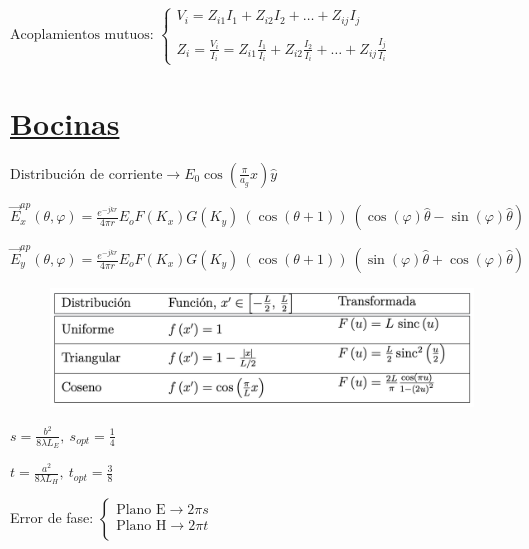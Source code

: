\documentclass[twocolumn, 8pt]{extarticle}
\begin{document}
\vspace{0.5cm}
\( \text{Acoplamientos mutuos: } \left \{
\begin{array}{l}
	V_i = Z_{i1}I_1 + Z_{i2}I_2 + \dots + Z_{ij}I_j \\ \\
	Z_i = \frac{V_i}{I_i} = Z_{i1} \frac{I_1}{I_i} + Z_{i2} \frac{I_2}{I_i} + \dots + Z_{ij} \frac{I_j}{I_i}
\end{array}
\right .
\)

\vspace{0.5cm}
\section*{\underline{Bocinas}}

\( \text{Distribución de corriente} \rightarrow E_0 \cos \left( \frac{\pi}{a_g}x \right) \hat{y} \)

\vspace{0.5cm}
\( \vec{E}_x^{ap}(\theta, \varphi) = \frac{e^{-jkr}}{4\pi r} E_o F(K_x) G(K_y)\ (\cos(\theta + 1))\ (\cos(\varphi) \hat{\theta} -  \sin(\varphi)\hat{\theta}) \)

\vspace{0.5cm}
\( \vec{E}_y^{ap}(\theta, \varphi) = \frac{e^{-jkr}}{4\pi r} E_o F(K_x) G(K_y)\ (\cos(\theta + 1))\ (\sin(\varphi) \hat{\theta} +  \cos(\varphi)\hat{\theta}) \)

\begin{figure}[H]
	\centering
	\includegraphics[width=\columnwidth]{distribuciones.png}
\end{figure}

\vspace{0.5cm}
\( s = \frac{ b^2 }{ 8\lambda L_E}, \ s_{opt} = \frac{1}{4} \)

\vspace{0.5cm}
\( t = \frac{ a^2 }{ 8\lambda L_H}, \ t_{opt} = \frac{3}{8} \)

\vspace{0.5cm}
Error de fase: \( \left \{
\begin{array}{l}
	\text{Plano E} \rightarrow 2\pi s \\
	\text{Plano H} \rightarrow 2\pi t \\
\end{array}
\right . \)
\end{document}
